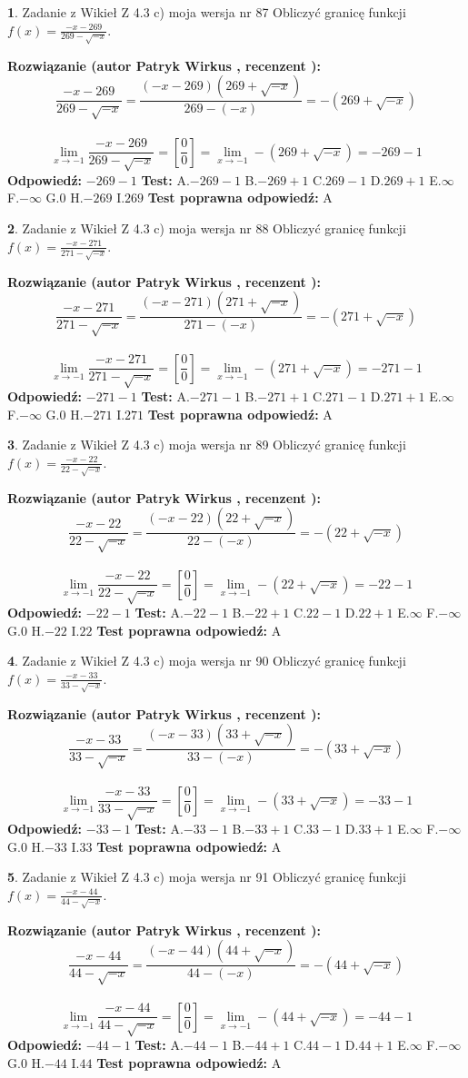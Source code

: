 \documentclass[12pt, a4paper]{article}
\theoremstyle{definition} %
\newtheorem{zad}{}
\newcommand{\zadStart}[1]{\begin{zad}#1\newline}
\newcommand{\zadStop}{\end{zad}}
\newcommand{\rozwStart}[2]{\noindent \textbf{Rozwiązanie (autor #1 , recenzent #2): }\newline}
\newcommand{\rozwStop}{\newline}
\newcommand{\odpStart}{\noindent \textbf{Odpowiedź:}\newline}
\newcommand{\odpStop}{\newline}
\newcommand{\testStart}{\noindent \textbf{Test:}\newline}
\newcommand{\testStop}{\newline}
\newcommand{\kluczStart}{\noindent \textbf{Test poprawna odpowiedź:}\newline}
\newcommand{\kluczStop}{\newline}
\begin{document}
\zadStart{Zadanie z Wikieł Z 4.3 c) moja wersja nr 87}
Obliczyć granicę funkcji $f(x)=\frac{-x-269}{269-\sqrt{-x}}$.
\zadStop
\rozwStart{Patryk Wirkus}{}
$$\frac{-x-269}{269-\sqrt{-x}}=\frac{(-x-269)(269+\sqrt{-x})}{269-(-x)}=-(269+\sqrt{-x})$$
\\
$$\lim\limits_{x\to-1}\frac{-x-269}{269-\sqrt{-x}}=[\frac{0}{0}]=\lim\limits_{x\to-1}-(269+\sqrt{-x}) =-269-1$$
\rozwStop
\odpStart
$-269-1$
\odpStop
\testStart
A.$-269-1$
B.$-269+1$
C.$269-1$
D.$269+1$
E.$\infty$
F.$-\infty$
G.$0$
H.$-269$
I.$269$
\testStop
\kluczStart
A
\kluczStop



\zadStart{Zadanie z Wikieł Z 4.3 c) moja wersja nr 88}
Obliczyć granicę funkcji $f(x)=\frac{-x-271}{271-\sqrt{-x}}$.
\zadStop
\rozwStart{Patryk Wirkus}{}
$$\frac{-x-271}{271-\sqrt{-x}}=\frac{(-x-271)(271+\sqrt{-x})}{271-(-x)}=-(271+\sqrt{-x})$$
\\
$$\lim\limits_{x\to-1}\frac{-x-271}{271-\sqrt{-x}}=[\frac{0}{0}]=\lim\limits_{x\to-1}-(271+\sqrt{-x}) =-271-1$$
\rozwStop
\odpStart
$-271-1$
\odpStop
\testStart
A.$-271-1$
B.$-271+1$
C.$271-1$
D.$271+1$
E.$\infty$
F.$-\infty$
G.$0$
H.$-271$
I.$271$
\testStop
\kluczStart
A
\kluczStop



\zadStart{Zadanie z Wikieł Z 4.3 c) moja wersja nr 89}
Obliczyć granicę funkcji $f(x)=\frac{-x-22}{22-\sqrt{-x}}$.
\zadStop
\rozwStart{Patryk Wirkus}{}
$$\frac{-x-22}{22-\sqrt{-x}}=\frac{(-x-22)(22+\sqrt{-x})}{22-(-x)}=-(22+\sqrt{-x})$$
\\
$$\lim\limits_{x\to-1}\frac{-x-22}{22-\sqrt{-x}}=[\frac{0}{0}]=\lim\limits_{x\to-1}-(22+\sqrt{-x}) =-22-1$$
\rozwStop
\odpStart
$-22-1$
\odpStop
\testStart
A.$-22-1$
B.$-22+1$
C.$22-1$
D.$22+1$
E.$\infty$
F.$-\infty$
G.$0$
H.$-22$
I.$22$
\testStop
\kluczStart
A
\kluczStop



\zadStart{Zadanie z Wikieł Z 4.3 c) moja wersja nr 90}
Obliczyć granicę funkcji $f(x)=\frac{-x-33}{33-\sqrt{-x}}$.
\zadStop
\rozwStart{Patryk Wirkus}{}
$$\frac{-x-33}{33-\sqrt{-x}}=\frac{(-x-33)(33+\sqrt{-x})}{33-(-x)}=-(33+\sqrt{-x})$$
\\
$$\lim\limits_{x\to-1}\frac{-x-33}{33-\sqrt{-x}}=[\frac{0}{0}]=\lim\limits_{x\to-1}-(33+\sqrt{-x}) =-33-1$$
\rozwStop
\odpStart
$-33-1$
\odpStop
\testStart
A.$-33-1$
B.$-33+1$
C.$33-1$
D.$33+1$
E.$\infty$
F.$-\infty$
G.$0$
H.$-33$
I.$33$
\testStop
\kluczStart
A
\kluczStop



\zadStart{Zadanie z Wikieł Z 4.3 c) moja wersja nr 91}
Obliczyć granicę funkcji $f(x)=\frac{-x-44}{44-\sqrt{-x}}$.
\zadStop
\rozwStart{Patryk Wirkus}{}
$$\frac{-x-44}{44-\sqrt{-x}}=\frac{(-x-44)(44+\sqrt{-x})}{44-(-x)}=-(44+\sqrt{-x})$$
\\
$$\lim\limits_{x\to-1}\frac{-x-44}{44-\sqrt{-x}}=[\frac{0}{0}]=\lim\limits_{x\to-1}-(44+\sqrt{-x}) =-44-1$$
\rozwStop
\odpStart
$-44-1$
\odpStop
\testStart
A.$-44-1$
B.$-44+1$
C.$44-1$
D.$44+1$
E.$\infty$
F.$-\infty$
G.$0$
H.$-44$
I.$44$
\testStop
\kluczStart
A
\kluczStop
\end{document}
